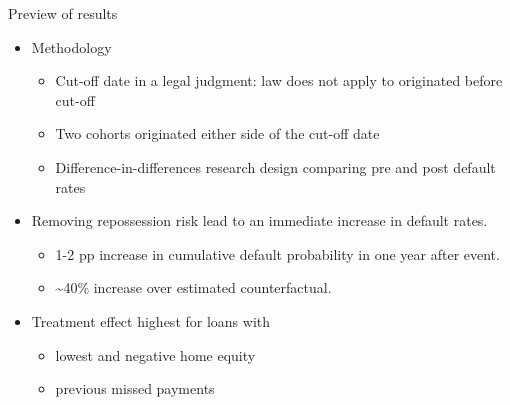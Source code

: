 \documentclass[ignorenonframetext,aspectratio=169]{beamer}
\providecommand{\tightlist}{%
  \setlength{\itemsep}{0pt}\setlength{\parskip}{0pt}}
\begin{document}
\begin{frame}{Preview of results}

\begin{itemize}
\tightlist
\item
  Methodology

  \begin{itemize}
  \tightlist
  \item
    Cut-off date in a legal judgment: law does not apply to originated
    before cut-off
  \item
    Two cohorts originated either side of the cut-off date
  \item
    Difference-in-differences research design comparing pre and post
    default rates
  \end{itemize}
\item
  Removing repossession risk lead to an immediate increase in default
  rates.

  \begin{itemize}
  \tightlist
  \item
    1-2 pp increase in cumulative default probability in one year after
    event.
  \item
    \textasciitilde{}40\% increase over estimated counterfactual.
  \end{itemize}
\item
  Treatment effect highest for loans with

  \begin{itemize}
  \tightlist
  \item
    lowest and negative home equity
  \item
    previous missed payments
  \end{itemize}
\end{itemize}

\end{frame}
\end{document}

